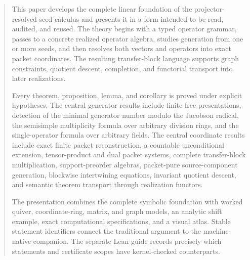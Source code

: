 \documentclass[11pt]{article}
\theoremstyle{definition}
\theoremstyle{remark}
\theoremstyle{definition}\newtheorem{example}[theorem]{Example}
\begin{document}
\thispagestyle{empty}
\par
\vspace{.6em}\par
\vspace{.7em}\noindent{\color{accent}\rule{\textwidth}{1pt}}
\vspace{1.1em}
\vspace{.7em}
\vspace{1em}\par
{}\par\vspace{1.3em}
\begin{abstract}
This paper develops the complete linear foundation of the projector-resolved seed calculus and presents it in a form intended to be read, audited, and reused.  The theory begins with a typed operator grammar, passes to a concrete realized operator algebra, studies generation from one or more seeds, and then resolves both vectors and operators into exact packet coordinates.  The resulting transfer-block language supports graph constraints, quotient descent, completion, and functorial transport into later realizations.

Every theorem, proposition, lemma, and corollary is proved under explicit hypotheses.  The central generator results include finite free presentations, detection of the minimal generator number modulo the Jacobson radical, the semisimple multiplicity formula over arbitrary division rings, and the single-operator formula over arbitrary fields.  The central coordinate results include exact finite packet reconstruction, a countable unconditional extension, tensor-product and dual packet systems, complete transfer-block multiplication, support-preorder algebras, packet-pure source-component generation, blockwise intertwining equations, invariant quotient descent, and semantic theorem transport through realization functors.

The presentation combines the complete symbolic foundation with worked quiver, coordinate-ring, matrix, and graph models, an analytic shift example, exact computational specifications, and a visual atlas. Stable statement identifiers connect the traditional argument to the machine-native companion. The separate Lean guide records precisely which statements and certificate scopes have kernel-checked counterparts.
\end{abstract}
\end{document}

